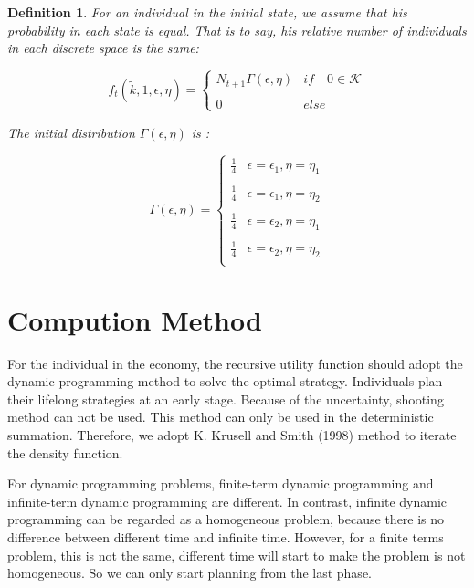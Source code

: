 \documentclass{article}
\newtheorem{definition}{Definition}[section]
\begin{document}
\begin{definition}
        For an individual in the initial state, we assume that his probability in each state is equal. That is to say, his relative number of individuals in each discrete space is the same:

        \begin{equation}
            f_{t}(\tilde{k},1,\epsilon,\eta)=
            \begin{cases}
                N_{t+1}\Gamma(\epsilon,\eta)& if\quad 0\in\mathcal{K}\\
                \\
                0& else
            \end{cases}
        \end{equation}
        
        The initial distribution $\Gamma(\epsilon,\eta)$ is : 

        \begin{equation}
            \Gamma(\epsilon,\eta)=
            \begin{cases}
                \frac{1}{4}& \epsilon=\epsilon_1,\eta=\eta_1\\
                \\
                \frac{1}{4}& \epsilon=\epsilon_1,\eta=\eta_2\\
                \\
                \frac{1}{4}& \epsilon=\epsilon_2,\eta=\eta_1\\
                \\
                \frac{1}{4}& \epsilon=\epsilon_2,\eta=\eta_2\\
            \end{cases}
        \end{equation}
    \end{definition}
\section{Compution Method}
    For the individual in the economy, the recursive utility function should adopt the dynamic programming method to solve the optimal strategy. Individuals plan their lifelong strategies at an early stage. Because of the uncertainty, shooting method can not be used. This method can only be used in the deterministic summation. Therefore, we adopt K. Krusell and Smith (1998) method to iterate the density function.

    For dynamic programming problems, finite-term dynamic programming and infinite-term dynamic programming are different. In contrast, infinite dynamic programming can be regarded as a homogeneous problem, because there is no difference between different time and infinite time. However, for a finite terms problem, this is not the same, different time will start to make the problem is not homogeneous. So we can only start planning from the last phase.
\end{document}
